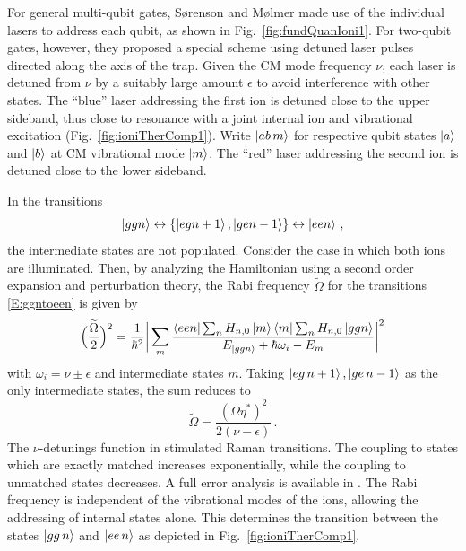 \documentclass[12pt,a4paper]{amsart}
\numberwithin{equation}{section}
\theoremstyle{plain}
\theoremstyle{definition}
\begin{document}
For general multi-qubit gates, S\o renson and M\o lmer  made use of the individual lasers to address each qubit, as shown in Fig.~\ref{fig:fundQuanIoni1}. For two-qubit gates, however, they proposed a special scheme using detuned laser pulses directed along the axis of the trap. Given the CM mode frequency $\nu$, each laser is detuned from $\nu$ by a suitably large amount $\epsilon$ to avoid interference with other states. The ``blue'' laser addressing the first ion is detuned close to the upper sideband, thus close to resonance with a joint internal ion and vibrational excitation (Fig.~\ref{fig:ioniTherComp1}). Write $\ket{ab\,m}$ for respective qubit states $\ket a$ and $\ket b$ at CM vibrational mode $\ket m$. The ``red'' laser addressing the second ion is detuned close to the lower sideband.


In the transitions
\begin{equation}\label{E:ggntoeen}
\ket{ggn}
\leftrightarrow 
\{\ket{egn+1},\ket{gen-1}\} 
\leftrightarrow 
\ket{een}\,,
\end{equation}
the intermediate states are not populated. Consider the case in which both ions are illuminated. Then, by analyzing the Hamiltonian using a second order expansion and perturbation theory, the Rabi frequency $\widetilde\Omega$ for the transitions \eqref{E:ggntoeen} is given by
$$
\Big(\frac{\widetilde{\Omega}}{2}\Big)^2 = \frac{1}{\hbar^2}\bigg\vert\sum_m \frac{\bra{een}\sum_n H_{n,0}\ket{m}\bra{m}\sum_n H_{n,0}\ket{ggn}}{E_{\ket{ggn}} + \hbar\omega_i - E_m}\bigg\vert^2
$$
with $\omega_i = \nu\pm\epsilon$ and intermediate states $m$. Taking $\ket{eg\,n+1},\ket{ge\,n-1}$ as the only intermediate states, the sum reduces to 
$$
\widetilde{\Omega} = \frac{(\Omega\eta^*)^2}{2(\nu - \epsilon)}\,.
$$
The $\nu$-detunings function in stimulated Raman transitions. The coupling to states which are exactly matched increases exponentially, while the coupling to unmatched states decreases. A full error analysis is available in \cite{ioniTherEnta}. The Rabi frequency is independent of the vibrational modes of the ions, allowing the addressing of internal states alone. This determines the transition between the states $\ket{gg\,n}$ and $\ket{ee\,n}$ as depicted in Fig.~\ref{fig:ioniTherComp1}.
\end{document}
